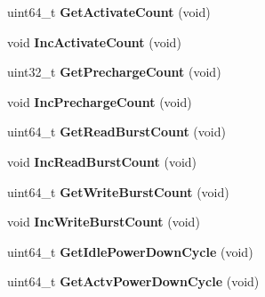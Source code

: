 \begin{DoxyCompactItemize}
\item 
\hypertarget{classMemRankBase_a6d33610172f9848fbf03008cc0362662}{uint64\-\_\-t {\bfseries Get\-Activate\-Count} (void)}\label{classMemRankBase_a6d33610172f9848fbf03008cc0362662}

\item 
\hypertarget{classMemRankBase_afd3a301b727b276db60a434c58efbb46}{void {\bfseries Inc\-Activate\-Count} (void)}\label{classMemRankBase_afd3a301b727b276db60a434c58efbb46}

\item 
\hypertarget{classMemRankBase_a53dd66ab1ae1ef7aaffa8fb97962e7b3}{uint32\-\_\-t {\bfseries Get\-Precharge\-Count} (void)}\label{classMemRankBase_a53dd66ab1ae1ef7aaffa8fb97962e7b3}

\item 
\hypertarget{classMemRankBase_a46f676f1a91434432dc9ce27e4a6b580}{void {\bfseries Inc\-Precharge\-Count} (void)}\label{classMemRankBase_a46f676f1a91434432dc9ce27e4a6b580}

\item 
\hypertarget{classMemRankBase_a05fb2ad9e92604c6fa452f2d391fc68b}{uint64\-\_\-t {\bfseries Get\-Read\-Burst\-Count} (void)}\label{classMemRankBase_a05fb2ad9e92604c6fa452f2d391fc68b}

\item 
\hypertarget{classMemRankBase_a1d167f969fd02e04f26d768545983d4c}{void {\bfseries Inc\-Read\-Burst\-Count} (void)}\label{classMemRankBase_a1d167f969fd02e04f26d768545983d4c}

\item 
\hypertarget{classMemRankBase_a1bc22aa65921f6a6991b6caa687101cf}{uint64\-\_\-t {\bfseries Get\-Write\-Burst\-Count} (void)}\label{classMemRankBase_a1bc22aa65921f6a6991b6caa687101cf}

\item 
\hypertarget{classMemRankBase_a1aec1d49d04e636233e9422f177d4690}{void {\bfseries Inc\-Write\-Burst\-Count} (void)}\label{classMemRankBase_a1aec1d49d04e636233e9422f177d4690}

\item 
\hypertarget{classMemRankBase_ac8fe72cb3949c1bed48d8ebcf3d39d2d}{uint64\-\_\-t {\bfseries Get\-Idle\-Power\-Down\-Cycle} (void)}\label{classMemRankBase_ac8fe72cb3949c1bed48d8ebcf3d39d2d}

\item 
\hypertarget{classMemRankBase_a9b844679d880587e58e3a764593fe8f1}{uint64\-\_\-t {\bfseries Get\-Actv\-Power\-Down\-Cycle} (void)}\label{classMemRankBase_a9b844679d880587e58e3a764593fe8f1}


\end{DoxyCompactItemize}
